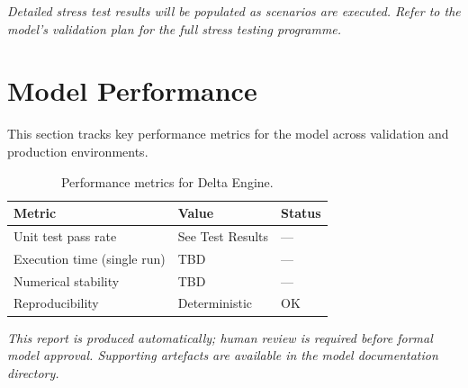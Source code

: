 \documentclass[11pt,a4paper]{article}
\begin{document}
\textit{Detailed stress test results will be populated as scenarios are executed.
Refer to the model's validation plan for the full stress testing programme.}

\section{Model Performance}

This section tracks key performance metrics for the model across
validation and production environments.

\begin{table}[H]
    \centering
    \caption{Performance metrics for Delta Engine.}
    \begin{tabular}{lll}
        \toprule
        \textbf{Metric} & \textbf{Value} & \textbf{Status} \\
        \midrule
        Unit test pass rate & See Test Results & --- \\
        Execution time (single run) & TBD & --- \\
        Numerical stability & TBD & --- \\
        Reproducibility & Deterministic & OK \\
        \bottomrule
    \end{tabular}
\end{table}

\vspace{12pt}

\noindent\textit{\small This report is produced automatically; human review
is required before formal model approval. Supporting artefacts are available
in the model documentation directory.}
\end{document}
